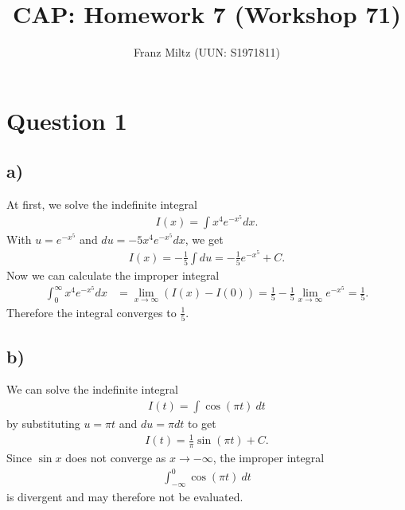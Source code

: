 \documentclass{article}
\title{CAP: Homework 7 (Workshop 71)}
\author{Franz Miltz (UUN: S1971811)}
\begin{document}
\maketitle
\section*{Question 1}
\subsection*{a)}
At first, we solve the indefinite integral
\begin{align*}
  I(x) = \int x^4e^{-x^5}dx.
\end{align*}
With $u=e^{-x^5}$ and $du=-5x^4e^{-x^5}dx$, we get
\begin{align*}
  I(x) = -\frac{1}{5}\int du = -\frac{1}{5}e^{-x^5} + C.
\end{align*}
Now we can calculate the improper integral
\begin{align*}
  \int_0^\infty x^4e^{-x^5}dx & = \lim_{x\to\infty}\left(I(x)-I(0)\right)
  = \frac{1}{5}-\frac{1}{5}\lim_{x\to\infty}e^{-x^5}=\frac{1}{5}.
\end{align*}
Therefore the integral converges to $\frac{1}{5}$.
\subsection*{b)}
We can solve the indefinite integral
\begin{align*}
  I(t) = \int \cos(\pi t)\:dt
\end{align*}
by substituting $u=\pi t$ and $du=\pi dt$ to get
\begin{align*}
  I(t) = \frac{1}{\pi} \sin(\pi t) + C.
\end{align*}
Since $\sin x$ does not converge as $x\to-\infty$, the improper integral
\begin{align*}
  \int_{-\infty}^0\cos(\pi t)\:dt
\end{align*}
is divergent and may therefore not be evaluated.
\end{document}
